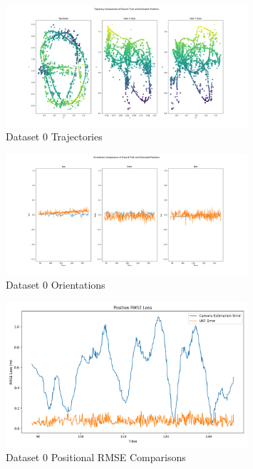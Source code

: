 \documentclass{article}
\begin{document}
\begin{figure}[H]
    \centering
    \includegraphics[width=0.8\textwidth]{./imgs/task4/studentdata0_ukf_positions.png}
    \caption{Dataset 0 Trajectories}
\end{figure}

\begin{figure}[H]
    \centering
    \includegraphics[width=0.8\textwidth]{./imgs/task4/studentdata0_ukf_orientations.png}
    \caption{Dataset 0 Orientations}
\end{figure}

\begin{figure}[H]
    \centering
    \includegraphics[width=0.8\textwidth]{./imgs/task4/studentdata0_ukf_position_rmse.png}
    \caption{Dataset 0 Positional RMSE Comparisons}
\end{figure}
\end{document}
